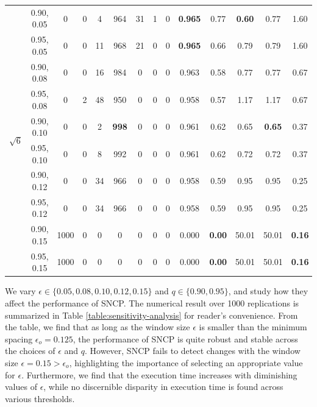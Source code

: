 \begin{table}[!h]
\begin{center}
{\begin{tabular}{c|c|ccccccc|c|c|c|c|c}
\multirow{10}{*}{$\sqrt{6}$} & 0.90, 0.05 & 0 & 0 & 4 & 964 & 31 & 1 & 0 & \textbf{0.965} & 0.77 & \textbf{0.60} & 0.77 & 1.60 \\& 0.95, 0.05 & 0 & 0 & 11 & 968 & 21 & 0 & 0 & \textbf{0.965} & 0.66 & 0.79 & 0.79 & 1.60 \\ & 0.90, 0.08 & 0 & 0 & 16 & 984 & 0 & 0 & 0 & 0.963 & 0.58 & 0.77 & 0.77 & 0.67 \\ & 0.95, 0.08 & 0 & 2 & 48 & 950 & 0 & 0 & 0 & 0.958 & 0.57 & 1.17 & 1.17 & 0.67 \\ & 0.90, 0.10 & 0 & 0 & 2 & \textbf{998} & 0 & 0 & 0 & 0.961 & 0.62 & 0.65 & \textbf{0.65} & 0.37 \\ & 0.95, 0.10 & 0 & 0 & 8 & 992 & 0 & 0 & 0 & 0.961 & 0.62 & 0.72 & 0.72 & 0.37 \\ & 0.90, 0.12 & 0 & 0 & 34 & 966 & 0 & 0 & 0 & 0.958 & 0.59 & 0.95 & 0.95 & 0.25 \\ & 0.95, 0.12 & 0 & 0 & 34 & 966 & 0 & 0 & 0 & 0.958 & 0.59 & 0.95 & 0.95 & 0.25 \\ & 0.90, 0.15 & 1000 & 0 & 0 & 0 & 0 & 0 & 0 & 0.000 & \textbf{0.00} & 50.01 & 50.01 & \textbf{0.16} \\ & 0.95, 0.15 & 1000 & 0 & 0 & 0 & 0 & 0 & 0 & 0.000 & \textbf{0.00} & 50.01 & 50.01 & \textbf{0.16} \\
\hline
  \hline   
\end{tabular}}
  \end{center}  
\end{table}
{ We vary $\epsilon \in \{0.05, 0.08, 0.10, 0.12, 0.15\}$ and $q\in \{0.90, 0.95\}$, and study how they affect the performance of SNCP. The numerical result over 1000 replications is summarized in Table \ref{table:sensitivity-analysis} for reader's convenience.  From the table, we find that as long as the window size  $\epsilon$ is smaller than the minimum spacing $\epsilon_o=0.125$, the performance of SNCP is quite robust and stable across the choices of $\epsilon$ and $q$. However,  SNCP fails to detect changes with the window size $\epsilon=0.15>\epsilon_o$, highlighting the importance of selecting an appropriate value for $\epsilon$. Furthermore, we find that the execution time increases with diminishing values of $\epsilon$, while no discernible disparity in execution time is found across various thresholds.
}
